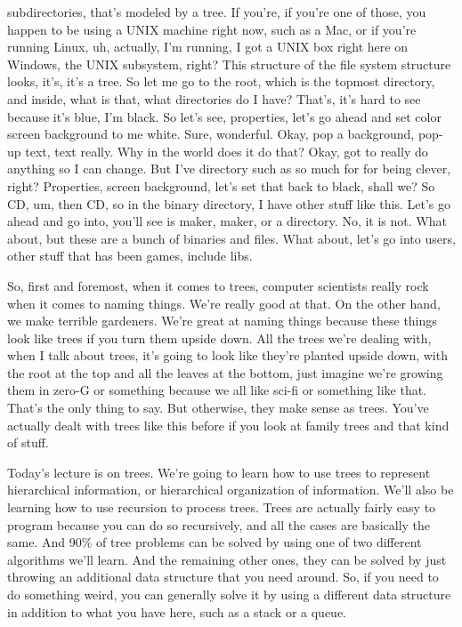 subdirectories, that's modeled by a tree. If you're, if you're one of those, you happen to be using a UNIX machine right now, such as a Mac, or if you're running Linux, uh, actually, I'm running, I got a UNIX box right here on Windows, the UNIX subsystem, right? This structure of the file system structure looks, it's, it's a tree. So let me go to the root, which is the topmost directory, and inside, what is that, what directories do I have? That's, it's hard to see because it's blue, I'm black. So let's see, properties, let's go ahead and set color screen background to me white. Sure, wonderful. Okay, pop a background, pop-up text, text really. Why in the world does it do that? Okay, got to really do anything so I can change. But I've directory such as so much for for being clever, right? Properties, screen background, let's set that back to black, shall we? So CD, um, then CD, so in the binary directory, I have other stuff like this. Let's go ahead and go into, you'll see is maker, maker, or a directory. No, it is not. What about, but these are a bunch of binaries and files. What about, let's go into users, other stuff that has been games, include libs. 


So, first and foremost, when it comes to trees, computer scientists really rock when it comes to naming things. We're really good at that. On the other hand, we make terrible gardeners. We're great at naming things because these things look like trees if you turn them upside down. All the trees we're dealing with, when I talk about trees, it's going to look like they're planted upside down, with the root at the top and all the leaves at the bottom, just imagine we're growing them in zero-G or something because we all like sci-fi or something like that. That's the only thing to say. But otherwise, they make sense as trees. You've actually dealt with trees like this before if you look at family trees and that kind of stuff.

Today's lecture is on trees. We're going to learn how to use trees to represent hierarchical information, or hierarchical organization of information. We'll also be learning how to use recursion to process trees. Trees are actually fairly easy to program because you can do so recursively, and all the cases are basically the same. And 90\% of tree problems can be solved by using one of two different algorithms we'll learn. And the remaining other ones, they can be solved by just throwing an additional data structure that you need around. So, if you need to do something weird, you can generally solve it by using a different data structure in addition to what you have here, such as a stack or a queue.

